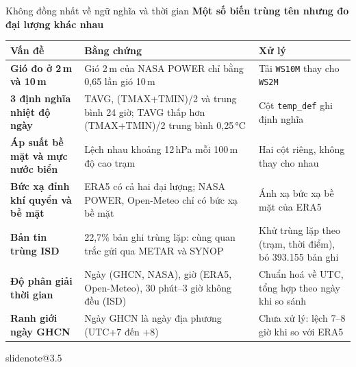 \documentclass[t,aspectratio=169,12pt]{beamer}
\makeatletter
\newcommand{\slidenote}[1]{\ifcsname slidenote@#1\endcsname\note{\csname slidenote@#1\endcsname}\fi}
\newcommand{\ychinh}[1]{\vskip1mm{\bfseries #1}\par\vskip1mm}
\makeatother
\begin{document}
\begin{frame}{Không đồng nhất về ngữ nghĩa và thời gian}
  \ychinh{Một số biến trùng tên nhưng đo đại lượng khác nhau}
  \scriptsize
  \renewcommand{\arraystretch}{0.9}
  \begin{tabular}{@{}>{\bfseries}p{2.9cm}p{5.6cm}p{5.1cm}@{}}
    \toprule
    Vấn đề & Bằng chứng & Xử lý \\
    \midrule
    Gió đo ở 2\,m và 10\,m & Gió 2\,m của NASA POWER chỉ bằng 0,65 lần gió 10\,m & Tải \texttt{WS10M} thay cho \texttt{WS2M} \\
    3 định nghĩa nhiệt độ ngày & TAVG, (TMAX+TMIN)/2 và trung bình 24 giờ; TAVG thấp hơn (TMAX+TMIN)/2 trung bình 0,25\,°C & Cột \texttt{temp\_def} ghi định nghĩa \\
    Áp suất bề mặt và mực nước biển & Lệch nhau khoảng 12\,hPa mỗi 100\,m độ cao trạm & Hai cột riêng, không thay cho nhau \\
    Bức xạ đỉnh khí quyển và bề mặt & ERA5 có cả hai đại lượng; NASA POWER, Open-Meteo chỉ có bức xạ bề mặt & Ánh xạ bức xạ bề mặt của ERA5 \\
    Bản tin trùng ISD & 22,7\% bản ghi trùng lặp: cùng quan trắc gửi qua METAR và SYNOP & Khử trùng lặp theo (trạm, thời điểm), bỏ 393.155 bản ghi \\
    Độ phân giải thời gian & Ngày (GHCN, NASA), giờ (ERA5, Open-Meteo), 30 phút--3 giờ không đều (ISD) & Chuẩn hoá về UTC, tổng hợp theo ngày khi so sánh \\
    Ranh giới ngày GHCN & Ngày GHCN là ngày địa phương (UTC+7 đến +8) & \textcolor{badred}{Chưa xử lý}: lệch 7--8 giờ khi so với ERA5 \\
    \bottomrule
  \end{tabular}
  \slidenote{3.5}
\end{frame}
\end{document}
